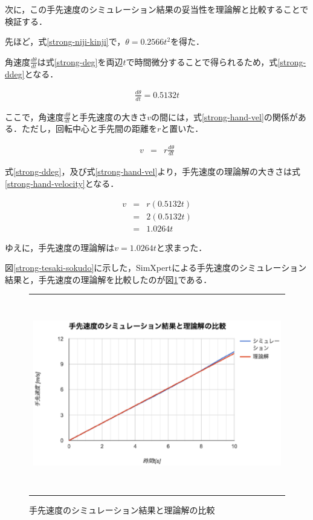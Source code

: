 次に，この手先速度のシミュレーション結果の妥当性を理論解と比較することで検証する．

先ほど，式\ref{strong-niji-kinji}で，\(\theta = 0.2566t^2\)を得た．

角速度\(\frac{d\theta}{dt}\)は式\ref{strong-deg}を両辺\(t\)で時間微分することで得られるため，式\ref{strong-ddeg}となる．

\begin{eqnarray}
  \frac{d\theta}{dt} = 0.5132t
  \label{strong-ddeg}
\end{eqnarray}

ここで，角速度\(\frac{d\theta}{dt}\)と手先速度の大きさ\(v\)の間には，式\ref{strong-hand-vel}の関係がある．ただし，回転中心と手先間の距離を\(r\)と置いた．

\begin{eqnarray}
  v &=& r\frac{d\theta}{dt}
  \label{strong-hand-vel}
\end{eqnarray}

式\ref{strong-ddeg}，及び式\ref{strong-hand-vel}より，手先速度の理論解の大きさは式\ref{strong-hand-velocity}となる．

\begin{eqnarray}
  v &=& r(0.5132t) \nonumber \\
    &=& 2(0.5132t) \nonumber \\
    &=& 1.0264t
  \label{strong-hand-velocity}
\end{eqnarray}

ゆえに，手先速度の理論解は\(v=1.0264t\)と求まった．

図\ref{strong-tesaki-sokudo}に示した，SimXpertによる手先速度のシミュレーション結果と，手先速度の理論解を比較したのが図\ref{strong-compare-vel}である．

\begin{figure}[htbp]
  \begin{center}
    \begin{tabular}{c}
      \includegraphics[height=8.5cm]{img/eps/strong-compare-vel.eps}
    \end{tabular}
    \caption{手先速度のシミュレーション結果と理論解の比較}
    \label{strong-compare-vel}
  \end{center}
\end{figure}

